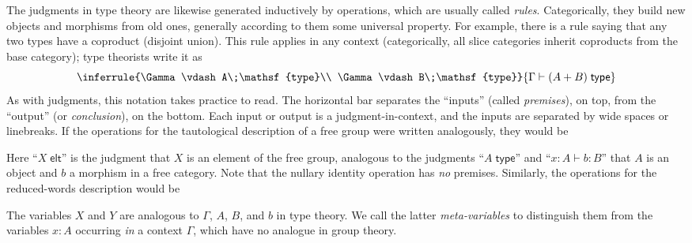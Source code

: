 \documentclass[10pt]{article}
\def\ty{\;\mathsf{type}}
\def\elt{\;\mathsf{elt}}
\def\types{\vdash}
\numberwithin{equation}{section}
\begin{document}
The judgments in type theory are likewise generated inductively by operations, which are usually called \emph{rules}.
Categorically, they build new objects and morphisms from old ones, generally according to them some universal property.
For example, there is a rule saying that any two types have a coproduct (disjoint union).
This rule applies in any context (categorically, all slice categories inherit coproducts from the base category);
type theorists write it as
\begin{equation}
  \inferrule{\Gamma \types A\ty \\ \Gamma\types B\ty}{\Gamma\types (A+B)\ty}\label{eq:coprod-form}
\end{equation}
As with judgments, this notation takes practice to read.
The horizontal bar separates the ``inputs'' (called \emph{premises}), on top, from the ``output'' (or \emph{conclusion}), on the bottom.
Each input or output is a judgment-in-context, and the inputs are separated by wide spaces or linebreaks.
%
If the operations for the tautological description of a free group were written analogously, they would be
Here ``$X \elt$'' is the judgment that $X$ is an element of the free group, analogous to the judgments ``$A\ty$'' and ``$x:A\types b:B$'' that $A$ is an object and $b$ a morphism in a free category.
Note that the nullary identity operation has \emph{no} premises.
Similarly, the operations for the reduced-words description would be

The variables $X$ and $Y$ are analogous to $\Gamma$, $A$, $B$, and $b$ in type theory.
We call the latter \emph{meta-variables} to distinguish them from the variables $x:A$ occurring \emph{in} a context $\Gamma$, which have no analogue in group theory.
\end{document}
